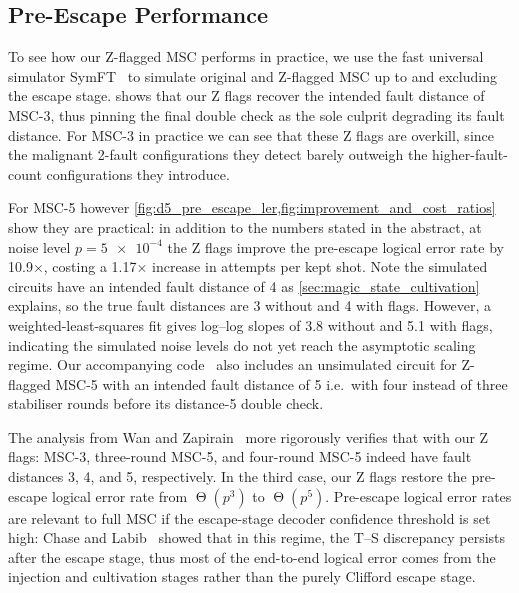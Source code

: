 \subsection{Pre-Escape Performance}\label{sec:pre_escape_performance}
To see how our Z-flagged MSC performs in practice,
we use the fast universal simulator SymFT~\cite{Fang2026a}
to simulate original and Z-flagged MSC
up to and excluding the escape stage.
 shows that our Z flags recover
the intended fault distance of MSC-3,
thus pinning the final double check as
the sole culprit degrading its fault distance.
For MSC-3 in practice we can see that these Z flags are overkill,
since the malignant 2-fault configurations they detect
barely outweigh the higher-fault-count configurations they introduce.

For MSC-5 however \cref{fig:d5_pre_escape_ler,fig:improvement_and_cost_ratios} show they are practical:
in addition to the numbers stated in the abstract,
at noise level $p =\num{5e-4}$
the Z flags improve the pre-escape logical error rate by 10.9$\times$,
costing a 1.17$\times$ increase in attempts per kept shot.
Note the simulated circuits have an intended fault distance of 4
as \cref{sec:magic_state_cultivation} explains,
so the true fault distances are 3 without and 4 with flags.
However,
a weighted-least-squares fit gives log--log slopes of
3.8 without and 5.1 with flags,
indicating the simulated noise levels do not yet reach the asymptotic scaling regime.
Our accompanying code~\cite{Chan2026c_quantum_bibstyle}
also includes an unsimulated circuit for Z-flagged MSC-5 with an intended fault distance of 5
i.e.\ with four instead of three stabiliser rounds before its distance-5 double check.

The analysis from Wan and Zapirain~\cite[Appendix~H.3--4]{Wan2026a}
more rigorously verifies that with our Z flags:
MSC-3,
three-round MSC-5,
and four-round MSC-5
indeed have fault distances 3, 4, and 5, respectively.
In the third case,
our Z flags restore the pre-escape logical error rate
from $\upTheta(p^3)$ to $\upTheta(p^5)$.
Pre-escape logical error rates are relevant to full MSC
if the escape-stage decoder confidence threshold is set high:
Chase and Labib~\cite[\S 4.2.2]{Chase2026} showed that in this regime,
the T--S discrepancy persists after the escape stage,
thus most of the end-to-end logical error
comes from the injection and cultivation stages
rather than the purely Clifford escape stage.

